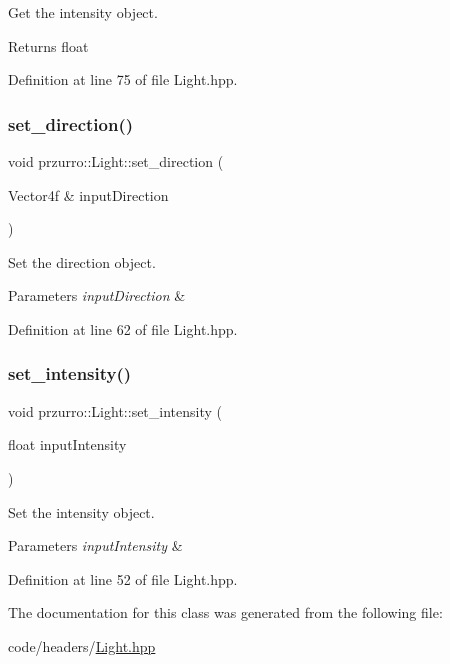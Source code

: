 Get the intensity object. 

\begin{DoxyReturn}{Returns}
float 
\end{DoxyReturn}


Definition at line 75 of file Light.\+hpp.

\mbox{\label{classprzurro_1_1_light_a73eb057d6e27c0480bed85545141125f}} 
\subsubsection{\texorpdfstring{set\_direction()}{set\_direction()}}
{\footnotesize\ttfamily void przurro\+::\+Light\+::set\+\_\+direction (\begin{DoxyParamCaption}\item[{Vector4f \&}]{input\+Direction }\end{DoxyParamCaption})\hspace{0.3cm}{\ttfamily [inline]}}



Set the direction object. 


\begin{DoxyParams}{Parameters}
{\em input\+Direction} & \\
\hline
\end{DoxyParams}


Definition at line 62 of file Light.\+hpp.

\mbox{\label{classprzurro_1_1_light_a9e0fd0796b5c829ed444bebfd85f6562}} 
\subsubsection{\texorpdfstring{set\_intensity()}{set\_intensity()}}
{\footnotesize\ttfamily void przurro\+::\+Light\+::set\+\_\+intensity (\begin{DoxyParamCaption}\item[{float}]{input\+Intensity }\end{DoxyParamCaption})\hspace{0.3cm}{\ttfamily [inline]}}



Set the intensity object. 


\begin{DoxyParams}{Parameters}
{\em input\+Intensity} & \\
\hline
\end{DoxyParams}


Definition at line 52 of file Light.\+hpp.



The documentation for this class was generated from the following file\+:\begin{DoxyCompactItemize}
\item 
code/headers/\mbox{\hyperlink{_light_8hpp}{Light.\+hpp}}\end{DoxyCompactItemize}

